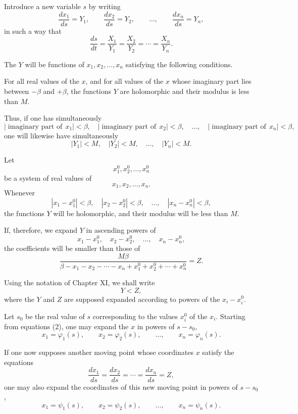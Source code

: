 \documentclass[11pt]{article}
\begin{document}
Introduce a new variable $s$ by writing
\begin{equation}
\frac{dx_1}{ds}=Y_1,\qquad \frac{dx_2}{ds}=Y_2,\qquad \ldots,\qquad \frac{dx_n}{ds}=Y_n,
\tag{2}
\end{equation}
in such a way that
\[
\frac{ds}{dt}=\frac{X_1}{Y_1}=\frac{X_2}{Y_2}=\cdots=\frac{X_n}{Y_n}.
\]

The $Y$ will be functions of $x_1,x_2,\ldots,x_n$ satisfying the following conditions.

For all real values of the $x$, and for all values of the $x$ whose imaginary part lies between $-\beta$ and $+\beta$, the functions $Y$ are holomorphic and their modulus is less than $M$.

Thus, if one has simultaneously
\[
|\operatorname{imaginary\ part\ of}\,x_1|<\beta,
\quad |\operatorname{imaginary\ part\ of}\,x_2|<\beta,
\quad \ldots,
\quad |\operatorname{imaginary\ part\ of}\,x_n|<\beta,
\]
one will likewise have simultaneously
\[
|Y_1|<M,
\quad |Y_2|<M,
\quad \ldots,
\quad |Y_n|<M.
\]

Let
\[
x_1^0,x_2^0,\ldots,x_n^0
\]
be a system of real values of
\[
x_1,x_2,\ldots,x_n.
\]
Whenever
\[
|x_1-x_1^0|<\beta,
\quad |x_2-x_2^0|<\beta,
\quad \ldots,
\quad |x_n-x_n^0|<\beta,
\]
the functions $Y$ will be holomorphic, and their modulus will be less than $M$.

If, therefore, we expand $Y$ in ascending powers of
\[
x_1-x_1^0,\quad x_2-x_2^0,\quad \ldots,
\quad x_n-x_n^0,
\]
the coefficients will be smaller than those of
\[
\frac{M\beta}{\beta-x_1-x_2-\cdots-x_n+x_1^0+x_2^0+\cdots+x_n^0}=Z.
\]

Using the notation of Chapter XI, we shall write
\[
Y<Z,
\]
where the $Y$ and $Z$ are supposed expanded according to powers of the $x_i-x_i^0$.

Let $s_0$ be the real value of $s$ corresponding to the values $x_i^0$ of the $x_i$. Starting from equations (2), one may expand the $x$ in powers of $s-s_0$,
\[
x_1=\varphi_1(s),\qquad x_2=\varphi_2(s),\qquad \ldots,\qquad x_n=\varphi_n(s).
\]

If one now supposes another moving point whose coordinates $x$ satisfy the equations
\begin{equation}
\frac{dx_1}{ds}=\frac{dx_2}{ds}=\cdots=\frac{dx_n}{ds}=Z,
\tag{2 bis}
\end{equation}
one may also expand the coordinates of this new moving point in powers of $s-s_0$,
\[
x_1=\psi_1(s),\qquad x_2=\psi_2(s),\qquad \ldots,
\qquad x_n=\psi_n(s).
\]
\end{document}
